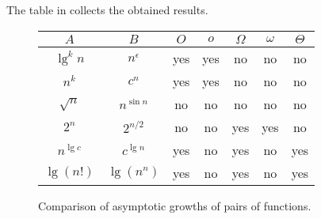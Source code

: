 The table in  collects the obtained results.
\begin{figure}[htb]
    \renewcommand{\arraystretch}{1.3}
    \begin{tabular}{cc|c|c|c|c|c|}
        $A$ & $B$ & $O$ & $o$ & $\Omega$ & $\omega$ & $\Theta$ \\
        \hline
        $\lg^kn$ & $n^\epsilon$ & \cellcolor{cyan!25}yes & \cellcolor{cyan!25}yes & no & no & no \\
        \hline
        $n^k$ & $c^n$ & \cellcolor{cyan!25}yes & \cellcolor{cyan!25}yes & no & no & no \\
        \hline
        $\sqrt{n}$ & $n^{\sin n}$ & no & no & no & no & no \\
        \hline
        $2^n$ & $2^{n/2}$ & no & no & \cellcolor{cyan!25}yes & \cellcolor{cyan!25}yes & no \\
        \hline
        $n^{\lg c}$ & $c^{\lg n}$ & \cellcolor{cyan!25}yes & no & \cellcolor{cyan!25}yes & no & \cellcolor{cyan!25}yes \\
        \hline
        $\lg(n!)$ & $\lg(n^n)$ & \cellcolor{cyan!25}yes & no & \cellcolor{cyan!25}yes & no & \cellcolor{cyan!25}yes \\
        \hline
    \end{tabular}
    \caption{Comparison of asymptotic growths of pairs of functions.} \label{fig:3-2}
\end{figure}

